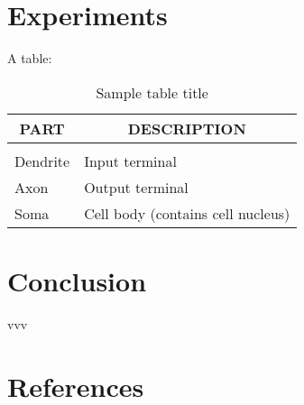 \documentclass{article} %
\begin{document}
\section{Experiments}

A table:

\begin{table}[t]
\caption{Sample table title}
\label{sample-table}
\begin{center}
\begin{tabular}{ll}
\multicolumn{1}{c}{\bf PART}  &\multicolumn{1}{c}{\bf DESCRIPTION}
\\ \hline \\
Dendrite         &Input terminal \\
Axon             &Output terminal \\
Soma             &Cell body (contains cell nucleus) \\
\end{tabular}
\end{center}
\end{table}

\section{Conclusion}

vvv

\section{References}



\end{document}
